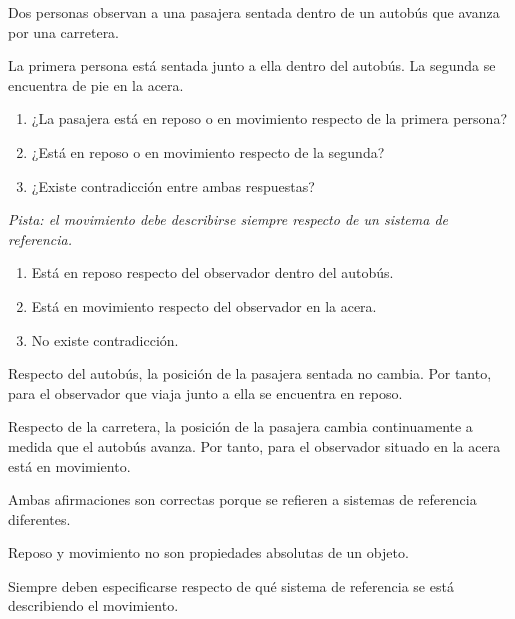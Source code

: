 \begin{ejercicio}
Dos personas observan a una pasajera sentada dentro de un autobús que avanza por una carretera.

La primera persona está sentada junto a ella dentro del autobús. La segunda se encuentra de pie en la acera.

\begin{enumerate}[label=\alph*)]
    \item ¿La pasajera está en reposo o en movimiento respecto de la primera persona?
    \item ¿Está en reposo o en movimiento respecto de la segunda?
    \item ¿Existe contradicción entre ambas respuestas?
\end{enumerate}

\textit{Pista: el movimiento debe describirse siempre respecto de un sistema de referencia.}
\end{ejercicio}

\begin{respuesta}
\begin{enumerate}[label=\alph*)]
    \item Está en reposo respecto del observador dentro del autobús.
    \item Está en movimiento respecto del observador en la acera.
    \item No existe contradicción.
\end{enumerate}
\end{respuesta}

\begin{explicacion}
Respecto del autobús, la posición de la pasajera sentada no cambia. Por tanto, para el observador que viaja junto a ella se encuentra en reposo.

Respecto de la carretera, la posición de la pasajera cambia continuamente a medida que el autobús avanza. Por tanto, para el observador situado en la acera está en movimiento.

Ambas afirmaciones son correctas porque se refieren a sistemas de referencia diferentes.

\begin{interpretacion}
Reposo y movimiento no son propiedades absolutas de un objeto.

Siempre deben especificarse respecto de qué sistema de referencia se está describiendo el movimiento.
\end{interpretacion}
\end{explicacion}


